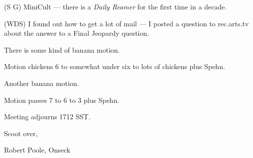 (S G) MiniCult --- there is a {\em Daily Reamer\/} for the first time in a
decade.

(WDS) I found out how to get a lot of mail --- I posted a question to
rec.arts.tv about the answer to a Final Jeopardy question.

There is some kind of banana motion.

Motion chickens 6 to somewhat under six to lots of chickens plus Spehn.

Another banana motion.

Motion passes 7 to 6 to 3 plus Spehn.

Meeting adjourns 1712 SST.

\vspace{0.15in}
\begin{center}
Scoot over,

Robert Poole, Onseck
\end{center}

